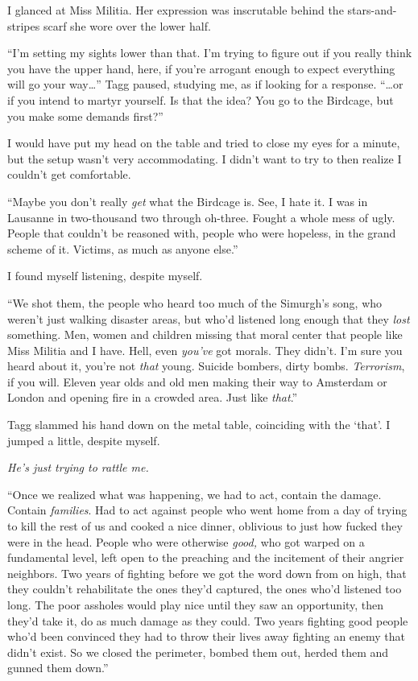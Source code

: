 I glanced at Miss Militia.  Her expression was inscrutable behind the stars-and-stripes scarf she wore over the lower half.



``I'm setting my sights lower than that.  I'm trying to figure out if you really think you have the upper hand, here, if you're arrogant enough to expect everything will go your way\ldots'' Tagg paused, studying me, as if looking for a response.  ``\ldots{}or if you intend to martyr yourself.  Is that the idea?  You go to the Birdcage, but you make some demands first?''



I would have put my head on the table and tried to close my eyes for a minute, but the setup wasn't very accommodating.  I didn't want to try to then realize I couldn't get comfortable.



``Maybe you don't really \emph{get} what the Birdcage is.  See, I hate it.  I was in Lausanne in two-thousand two through oh-three.  Fought a whole mess of ugly.  People that couldn't be reasoned with, people who were hopeless, in the grand scheme of it.  Victims, as much as anyone else.''



I found myself listening, despite myself.



``We shot them, the people who heard too much of the Simurgh's song, who weren't just walking disaster areas, but who'd listened long enough that they \emph{lost} something.  Men, women and children missing that moral center that people like Miss Militia and I have.  Hell, even \emph{you've} got morals.  They didn't.  I'm sure you heard about it, you're not \emph{that} young.  Suicide bombers, dirty bombs.  \emph{Terrorism}, if you will.  Eleven year olds and old men making their way to Amsterdam or London and opening fire in a crowded area.  Just like \emph{that}.''



Tagg slammed his hand down on the metal table, coinciding with the `that'.  I jumped a little, despite myself.



\emph{He's just trying to rattle me.}



``Once we realized what was happening, we had to act, contain the damage.  Contain \emph{families}.  Had to act against people who went home from a day of trying to kill the rest of us and cooked a nice dinner, oblivious to just how fucked they were in the head.  People who were otherwise \emph{good, }who got warped on a fundamental level, left open to the preaching and the incitement of their angrier neighbors.  Two years of fighting before we got the word down from on high, that they couldn't rehabilitate the ones they'd captured, the ones who'd listened too long.  The poor assholes would play nice until they saw an opportunity, then they'd take it, do as much damage as they could.  Two years fighting good people who'd been convinced they had to throw their lives away fighting an enemy that didn't exist.  So we closed the perimeter, bombed them out, herded them and gunned them down.''




